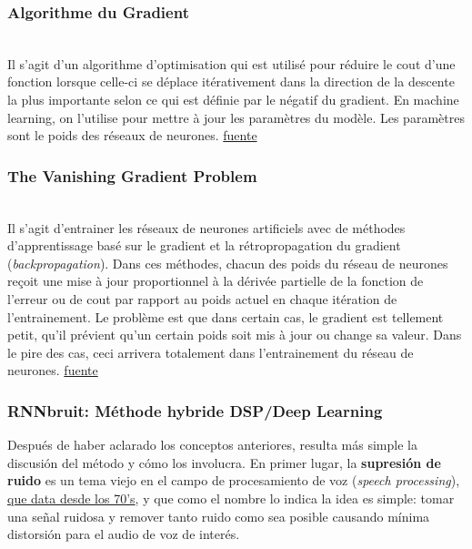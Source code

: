 \documentclass[conference,onecolumn]{IEEEtran}
\begin{document}
\subsubsection{Algorithme du  Gradient}
\hfill\\
Il s’agit d’un algorithme d’optimisation qui est utilisé pour réduire le cout d’une fonction lorsque celle-ci se déplace itérativement dans la direction de la descente la plus importante selon ce qui est définie par le négatif du gradient. En machine learning, on l’utilise pour mettre à jour les paramètres du modèle. Les paramètres sont le poids des réseaux de neurones.
\href{https://ml-cheatsheet.readthedocs.io/en/latest/gradient_descent.html}{fuente}
\medskip

\subsubsection{The Vanishing Gradient Problem}
\hfill\\
Il s’agit d’entrainer les réseaux de neurones artificiels avec de méthodes d’apprentissage basé sur le gradient  et la rétropropagation du gradient (\textit{backpropagation}). Dans ces méthodes, chacun des poids du réseau de neurones reçoit une mise à jour proportionnel à la dérivée partielle de la fonction de l’erreur ou de cout par rapport au poids actuel en chaque itération de l’entrainement. Le problème est que dans certain cas, le gradient est tellement petit, qu’il prévient qu’un certain poids soit mis à jour ou change sa valeur. Dans le pire des cas, ceci arrivera totalement dans l’entrainement du réseau de neurones. 
\href{https://en.wikipedia.org/wiki/Vanishing_gradient_problem}{fuente}
\medskip


\subsubsection{\textbf{RNNbruit: Méthode hybride DSP/Deep Learning}}
\medskip
\hfill
\medskip

Después de haber aclarado los conceptos anteriores, resulta más simple la discusión del método y cómo los involucra. En primer lugar, la \textbf{supresión de ruido} es un tema viejo en el campo de procesamiento de voz (\textit{speech processing}), \href{https://ieeexplore.ieee.org/document/1163209}{que data desde los 70's}, y que como el nombre lo indica la idea es simple: tomar una señal ruidosa y remover tanto ruido como sea posible causando mínima distorsión para el audio de voz de interés.
\end{document}
